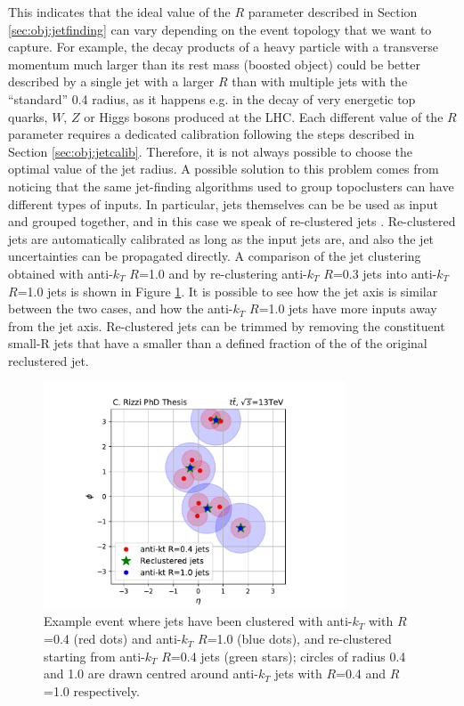 This indicates that the ideal value of the $R$ parameter described in Section \ref{sec:obj:jetfinding} can vary depending on the event topology that we want to capture. 
For example, the decay products of a heavy particle with a transverse momentum much larger than its rest mass (boosted object) could be better described by a 
single jet with a larger $R$ than with multiple jets with the ``standard'' 0.4 radius, 
as it happens e.g. in the decay of very energetic top quarks, $W$, $Z$ or Higgs bosons produced at the LHC.
Each different value of the $R$ parameter requires a dedicated calibration following the steps described in Section \ref{sec:obj:jetcalib}. 
Therefore, it is not always possible to choose the optimal value of the jet radius. 
A possible solution to this problem comes from noticing that the same jet-finding algorithms used to group topoclusters can have different types of inputs. 
In particular, jets themselves can be be used as input and grouped together, and in this case we speak of re-clustered jets \cite{Nachman:2014kla}. 
Re-clustered jets are automatically calibrated as long as the input jets are, and also the jet uncertainties can be propagated directly. 
A comparison of the jet clustering obtained with anti-$k_T$ $R$=1.0 and by re-clustering anti-$k_T$ $R$=0.3 jets into anti-$k_T$ $R$=1.0 jets 
is shown in Figure \ref{fig:recluster}. It is possible to see how the jet axis is similar between the two cases, and how the anti-$k_T$ $R$=1.0 jets have more inputs away from the jet axis.
Re-clustered jets can be trimmed by removing the constituent small-R jets that have a \pt smaller than a defined fraction of the \pt of the original reclustered jet. 


\begin{figure}[h]
\begin{center}
\includegraphics[width=0.8\textwidth]{./figures/springer/300571_37319012.pdf}
\end{center}
\caption{Example event where jets have been clustered with anti-$k_T$ with $R$=0.4 (red dots) and anti-$k_T$ $R$=1.0 (blue dots), and re-clustered starting from anti-$k_T$ $R$=0.4 jets (green stars); 
circles of radius 0.4 and 1.0 are drawn centred around anti-$k_T$ jets with $R$=0.4 and $R$=1.0 respectively. }
\label{fig:recluster}
\end{figure}

